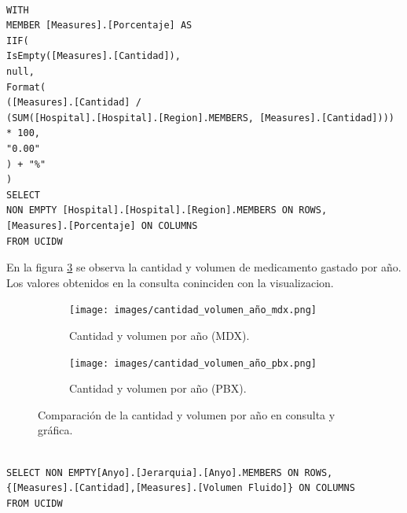 \documentclass{article}
\begin{document}
\begin{lstlisting}[style=ddlstyle, label=lst:consulta2, caption=Cantidad por Región]

WITH 
MEMBER [Measures].[Porcentaje] AS
IIF(
IsEmpty([Measures].[Cantidad]),
null,
Format(
([Measures].[Cantidad] / 
(SUM([Hospital].[Hospital].[Region].MEMBERS, [Measures].[Cantidad]))) * 100, 
"0.00"
) + "%"
)
SELECT 
NON EMPTY [Hospital].[Hospital].[Region].MEMBERS ON ROWS,
[Measures].[Porcentaje] ON COLUMNS
FROM UCIDW
\end{lstlisting}

En la figura \ref{fig:volumen_año_comparacion} se observa la cantidad y volumen de medicamento gastado por año. Los valores obtenidos en la consulta coninciden con la visualizacion.

\begin{figure}[H]
	\centering
	\begin{subfigure}[b]{0.4\textwidth}
		\centering
		\texttt{[image: images/cantidad\_volumen\_año\_mdx.png]}
		\caption{Cantidad y volumen por año (MDX).}
		\label{fig:volumen_año_mdx}
	\end{subfigure}
	\hfill
	\begin{subfigure}[b]{0.4\textwidth}
		\centering
		\texttt{[image: images/cantidad\_volumen\_año\_pbx.png]}
		\caption{Cantidad y volumen por año (PBX).}
		\label{fig:volumen_año_pbx}
	\end{subfigure}
	\caption{Comparación de la cantidad y volumen por año en consulta y gráfica.}
	\label{fig:volumen_año_comparacion}
\end{figure}

\begin{lstlisting}[style=ddlstyle, label=lst:consulta3, caption=Cantidad y Volumen por Año]

SELECT NON EMPTY[Anyo].[Jerarquia].[Anyo].MEMBERS ON ROWS, 
{[Measures].[Cantidad],[Measures].[Volumen Fluido]} ON COLUMNS
FROM UCIDW
\end{lstlisting}
\end{document}
